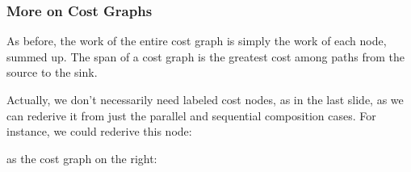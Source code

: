 \documentclass[aspectratio=169, handout]{beamer}
\newcommand{\hex}[4][]{\node[hex, #1, minimum size=1cm] (#2) {$W$: #3 \\ $S$: #4}}
\begin{document}
\begin{frame}[fragile]
  \frametitle{More on Cost Graphs}

  \begin{center}
  \begin{minipage}{0.65\textwidth}
    \raggedright
    As before, the work of the entire cost graph is simply the work of each
    node, summed up. The span of a cost graph is the greatest cost among
    paths from the source to the sink.

    \vspace{10pt}

    Actually, we don't necessarily need labeled cost nodes, as in the last
    slide, as we can rederive it from just the parallel and sequential
    composition cases. For instance, we could rederive this node:

    \vspace{5pt}

    \begin{center}
    \end{center}

   \vspace{5pt}

   as the cost graph on the right:
  \end{minipage}
  \hfill
  \begin{minipage}{0.34\textwidth}
    \centering
  \end{minipage}
  \end{center}
\end{frame}
\end{document}
